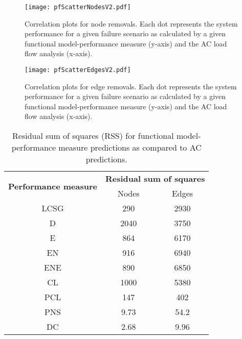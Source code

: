 
\begin{figure}[!ph]

\centerline{\texttt{[image: pfScatterNodesV2.pdf]}}
\caption[Correlation plots for node removals.]{\label{fig:ch3:pfScatterNodes}Correlation plots for node removals. Each dot represents the system performance for a given failure scenario as calculated by a given functional model-performance measure (y-axis) and the AC load flow analysis (x-axis).}
\end{figure}



\begin{figure}[!htp]
\centerline{\texttt{[image: pfScatterEdgesV2.pdf]}}
\caption[Correlation plots for edge removals.]{\label{fig:ch3:pfScatterEdges}Correlation plots for edge removals. Each dot represents the system performance for a given failure scenario as calculated by a given functional model-performance measure (y-axis) and the AC load flow analysis (x-axis).}
\end{figure}



\begin{table}
\centering

\begin{tabular}{ccc}
\toprule
\multirow{2}{*}{\textbf{Performance measure}} & \multicolumn{2}{c}{\textbf{Residual sum of squares}}\\
 & {Nodes} & {Edges}\\

\midrule

LCSG & 290 & 2930 \\
D & 2040 & 3750 \\
E & 864 & 6170 \\
EN & 916 & 6940 \\
ENE & 890 & 6850 \\
CL & 1000 & 5380 \\
PCL & 147 & 402 \\
PNS & 9.73 & 54.2 \\
DC & 2.68 & 9.96 \\

\bottomrule
\end{tabular}

\caption[Residual sum of squares for functional model-performance measure predictions.]{\label{tab:ch3:rss}Residual sum of squares (RSS) for functional model-performance measure predictions as compared to AC predictions.}

\end{table}

